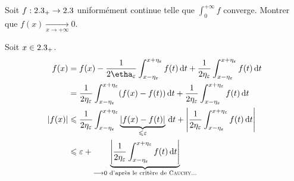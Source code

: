 \begin{exercice}
    Soit $f : 2.3_+ \to 2.3$ uniformément continue telle que $\int_0^{+\infty} f$ converge. Montrer que $f(x) \xrightarrow[x \to + \infty]{} 0$.
\end{exercice}

\begin{solution}
    Soit $x \in 2.3_+$.
    \begin{align*}
        f(x) &= f(x) - \frac{1}{2\etha_{\varepsilon}} \int_{x-\eta_{\varepsilon}}^{x+\eta_{\varepsilon}} f(t) \d t + \frac{1}{2\eta_{\varepsilon}} \int_{x-\eta_{\varepsilon}}^{x+\eta_{\varepsilon}} f(t) \d t \\
        &= \frac{1}{2\eta_{\varepsilon}} \int_{x-\eta_{\varepsilon}}^{x+\eta_{\varepsilon}} (f(x) - f(t)) \d t + \frac{1}{2\eta_{\varepsilon}} \int_{x-\eta_{\varepsilon}}^{x+\eta_{\varepsilon}} f(t) \d t \\
        |f(x)| &\leqslant \frac{1}{2\eta_{\varepsilon}} \int_{x-\eta_{\varepsilon}}^{x+\eta_{\varepsilon}} \underbrace{|f(x) - f(t)|}_{\leqslant \varepsilon} \d t + \left| \frac{1}{2\eta_{\varepsilon}} \int_{x-\eta_{\varepsilon}}^{x+\eta_{\varepsilon}} f(t) \d t \right| \\
        &\leqslant \varepsilon + \underbrace{\left| \frac{1}{2\eta_{\varepsilon}} \int_{x-\eta_{\varepsilon}}^{x+\eta_{\varepsilon}} f(t) \d t \right|}_{\longrightarrow 0 \text{ d'après le critère de \textsc{Cauchy}...}}
    \end{align*}
\end{solution}

